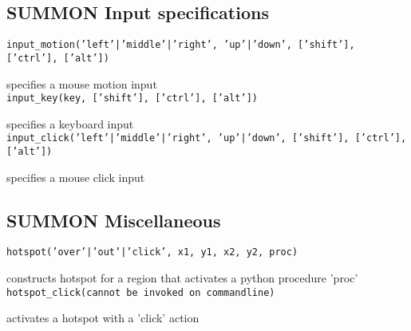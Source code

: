 \subsection{SUMMON Input specifications}

{\tt input\_motion('left'|'middle'|'right', 'up'|'down', ['shift'], ['ctrl'], ['alt']) }

specifies a mouse motion input \\


{\tt input\_key(key, ['shift'], ['ctrl'], ['alt']) }

specifies a keyboard input \\


{\tt input\_click('left'|'middle'|'right', 'up'|'down', ['shift'], ['ctrl'], ['alt']) }

specifies a mouse click input \\


\subsection{SUMMON Miscellaneous}

{\tt hotspot('over'|'out'|'click', x1, y1, x2, y2, proc) }

constructs hotspot for a region that activates a python procedure 'proc' \\


{\tt hotspot\_click(cannot be invoked on commandline) }

activates a hotspot with a 'click' action \\


